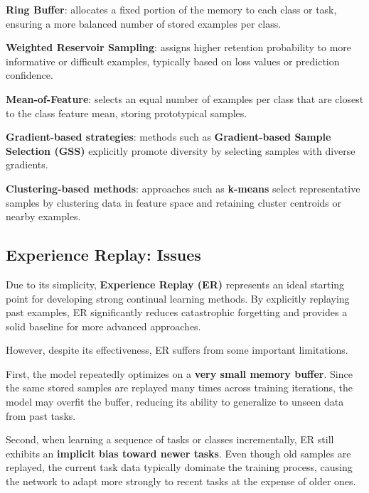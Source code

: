 \begin{compactitemize}
    \item \textbf{Ring Buffer}: allocates a fixed portion of the memory to each class or
    task, ensuring a more balanced number of stored examples per class.
    
    \item \textbf{Weighted Reservoir Sampling}: assigns higher retention probability to
    more informative or difficult examples, typically based on loss values or prediction
    confidence.
    
    \item \textbf{Mean-of-Feature}: selects an equal number of examples per class that are
    closest to the class feature mean, storing prototypical samples.
    
    \item \textbf{Gradient-based strategies}: methods such as \textbf{Gradient-based
    Sample Selection (GSS)} explicitly promote diversity by selecting samples with
    diverse gradients.
    
    \item \textbf{Clustering-based methods}: approaches such as \textbf{k-means} select
    representative samples by clustering data in feature space and retaining cluster
    centroids or nearby examples.
\end{compactitemize}

\subsection{Experience Replay: Issues}

Due to its simplicity, \textbf{Experience Replay (ER)} represents an ideal starting point
for developing strong continual learning methods. By explicitly replaying past examples,
ER significantly reduces catastrophic forgetting and provides a solid baseline for more
advanced approaches.

However, despite its effectiveness, ER suffers from some important limitations.

First, the model repeatedly optimizes on a \textbf{very small memory buffer}. Since the
same stored samples are replayed many times across training iterations, the model may
overfit the buffer, reducing its ability to generalize to unseen data from past tasks.

Second, when learning a sequence of tasks or classes incrementally, ER still exhibits an
\textbf{implicit bias toward newer tasks}. Even though old samples are replayed, the
current task data typically dominate the training process, causing the network to adapt
more strongly to recent tasks at the expense of older ones.


